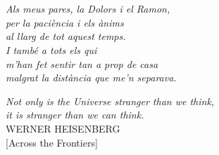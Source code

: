 \chapter*{}
\begin{flushright}
\textit{
  Als meus pares, la Dolors i el Ramon,  \\
  per la paci\`{e}ncia i els \`{a}nims \\
  al llarg de tot aquest temps.\\
  I tamb\'{e} a tots els qui  \\
  m'han fet sentir tan a prop de casa\\
  malgrat la dist\`{a}ncia que me'n separava.
}
  \end{flushright}


\vfill

\begin{flushbottom}
\begin{center}
\textit{
 Not only is the Universe stranger than we think, \\
 it is stranger than we can think.
} \\[12pt]

WERNER HEISENBERG\\[12pt]

[Across the Frontiers]
\end{center}
\end{flushbottom}
